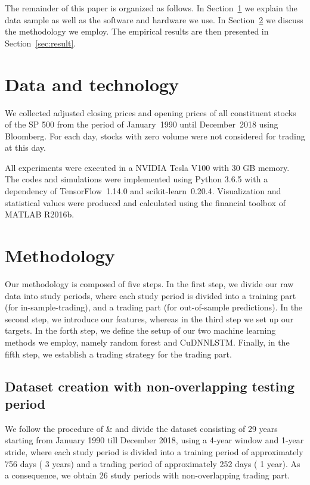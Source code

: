 \documentclass[review]{elsarticle}
\begin{document}
The  remainder of this paper is organized as follows. 
In Section~\ref{sec:data} we explain the data sample as well as the software and  hardware we use. In Section~\ref{sec:method} we discuss the methodology we employ. The empirical results are then presented
in Section~\ref{sec:result}.





\section{Data and technology}\label{sec:data}

 We collected adjusted closing prices and opening prices
of all constituent stocks of the SP 500 from the period of January~1990 until December~2018 using Bloomberg. For each day, stocks with zero volume were  not considered for trading at this day.


All experiments were executed in a NVIDIA Tesla V100 with 30 GB memory. The codes and simulations were implemented using Python 3.6.5 with a dependency of 
TensorFlow~1.14.0 and scikit-learn~0.20.4.
Visualization and statistical values were produced and calculated using the financial toolbox of MATLAB R2016b. 


\section{Methodology}\label{sec:method}
Our methodology is composed of five steps. In the first step, we divide our raw data into study periods, where each study period is divided into a training part (for in-sample-trading), and a trading part (for out-of-sample predictions). 
In the second step, we introduce our features, whereas 
in the third step we set up our targets. 
In the forth step, we  define the setup of our two machine learning methods we employ, namely random forest and CuDNNLSTM. 
Finally, in the fifth step, we establish a trading strategy for the trading part. 





\subsection{Dataset creation with non-overlapping testing period}

We follow the procedure of \cite{krauss17} \& \cite{krauss18} and divide the  dataset consisting of 29 years starting from January 1990 till December 2018, using a 4-year window and 1-year stride, where each study period is divided into a training period of approximately 756 days ( 3 years) and a trading period of  approximately 252 days ( 1 year). As a consequence, we obtain 26 study periods with non-overlapping trading part. 
\end{document}
